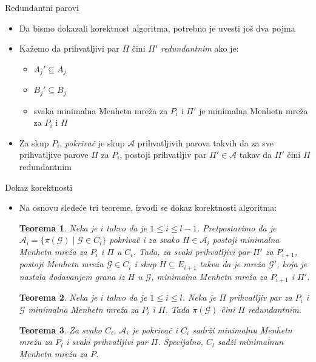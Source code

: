 \documentclass[10pt]{beamer}
\newtheorem{teo}{Teorema}
\begin{document}
\begin{frame}{Redundantni parovi}
\begin{itemize}
\item Da bismo dokazali korektnost algoritma, potrebno je uvesti još dva pojma
\item Kažemo da prihvatljivi par $\Pi$ čini $\Pi'$ \textit{redundantnim} ako je:
\begin{itemize}
    \item $A_j' \subseteq A_j$
    \item $B_j' \subseteq B_j$
    \item svaka minimalna Menhetn mreža za $P_i$ i $\Pi'$ je minimalna Menhetn mreža za $P_i$ i $\Pi$
\end{itemize}
    \item Za skup $P_i$, \textit{pokrivač} je skup $\mathcal{A}$ prihvatljivih parova takvih da za sve prihvatljive parove $\Pi$ za $P_i$, postoji prihvatljiv par $\Pi' \in \mathcal{A}$ takav da $\Pi'$ čini $\Pi$ redundantnim
\end{itemize}
\end{frame}

\begin{frame}{Dokaz korektnosti}
\begin{itemize}
    \item Na osnovu sledeće tri teoreme, izvodi se dokaz korektnosti algoritma:
    \begin{teo}
            Neka je $i$ takvo da je $1 \leq i \leq l-1$. Pretpostavimo da je $\mathcal{A}_i = \{ \pi(\mathcal{G}) \mid \mathcal{G} \in C_i \}$ pokrivač i za svako $\Pi \in \mathcal{A}_i$ postoji minimalna Menhetn mreža za $P_i$ i $\Pi$ u $C_i$. Tada, za svaki prihvatljivi par $\Pi'$ za $P_{i+1}$, postoji Menhetn mreža $\mathcal{G} \in C_i$ i skup $H \subseteq E_{i+1}$ takva da je mreža $\mathcal{G'}$, koja je nastala dodavanjem grana iz $H$ u $\mathcal{G}$, minimalna Menhetn mreža za $P_{i+1}$ i $\Pi'$.
        \end{teo}
        \begin{teo}
            Neka je $i$ takvo da je $1 \leq i \leq l$. Neka je $\Pi$ prihvatljiv par za $P_i$ i $\mathcal{G}$ minimalna Menhetn mreža za $P_i$ i $\Pi$. Tada $\pi(\mathcal{G})$ čini $\Pi$ redundantnim.
        \end{teo}
            \begin{teo}
        Za svako $C_i$, $\mathcal{A}_i$ je pokrivač i $C_i$ sadrži minimalnu Menhetn mrežu za $P_i$ i svaki prihvatljivi par $\Pi$. Specijalno, $C_l$ sadži minimalnun Menhetn mrežu za $P$.
    \end{teo}
\end{itemize}
\end{frame}
\end{document}
